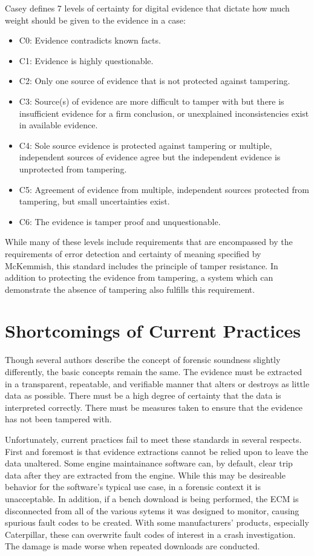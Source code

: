 Casey \cite{casey2002} defines 7 levels of certainty for digital evidence that dictate how much weight should be given to the evidence in a case:

\begin{itemize}
\item C0: Evidence contradicts known facts.
\item C1: Evidence is highly questionable.
\item C2: Only one source of evidence that is not protected against tampering.
\item C3: Source(s) of evidence are more difficult to tamper with but there is insufficient evidence for a firm conclusion, or unexplained inconsistencies exist in available evidence.
\item C4: Sole source evidence is protected against tampering or multiple, independent sources of evidence agree but the independent evidence is unprotected from tampering.
\item C5: Agreement of evidence from multiple, independent sources protected from tampering, but small uncertainties exist.
\item C6: The evidence is tamper proof and unquestionable.
\end{itemize}

While many of these levels include requirements that are encompassed by the requirements of error detection and certainty of meaning 
specified by McKemmish, this standard includes the principle of tamper resistance. In addition to protecting the evidence from tampering, 
a system which can demonstrate the absence of tampering also fulfills this requirement.

\section{Shortcomings of Current Practices}

Though several authors describe the concept of forensic soundness slightly differently, the basic concepts remain the same. The evidence must be extracted in a transparent,
repeatable, and verifiable manner that alters or destroys as little data as possible. There must be a high degree of certainty that the data is interpreted correctly. There must
be measures taken to ensure that the evidence has not been tampered with.

Unfortunately, current practices fail to meet these standards in several respects. 
First and foremost is that evidence extractions cannot be relied upon to leave the data unaltered.
Some engine maintainance software can, by default, clear trip data after they are extracted from the engine. While this may be desireable behavior for the software's typical
use case, in a forensic context it is unacceptable. In addition, if a bench download is being performed, the ECM is disconnected from all of the various sytems it was designed to monitor,
causing spurious fault codes to be created. With some manufacturers' products, especially Caterpillar, these can overwrite fault codes of interest in a crash investigation. 
The damage is made worse when repeated downloads are conducted.

